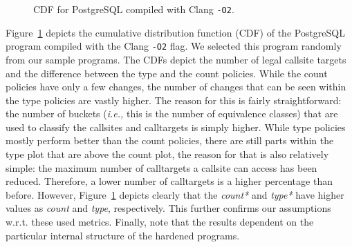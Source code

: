 \begin{figure}[h] 
\vspace{-.9cm}
  \begin{minipage}[b]{1.0\linewidth}
    \centering
    \resizebox{.7\columnwidth}{!}{}
    \vspace{-.4cm}
    \caption{CDF for PostgreSQL compiled with Clang \texttt{-O2}.} 
    \label{fig7} 
    \vspace{1ex}
  \end{minipage}%
\vspace{-.2cm}
\end{figure}
Figure~\ref{fig7}
depicts the cumulative distribution function (CDF) of the PostgreSQL program compiled with the Clang \texttt{-O2} flag. 
We selected this program randomly from our sample programs. 
The CDFs depict the number of legal callsite targets and the difference between the type and the count policies. 
While the count policies have only a few changes, the number of changes that can be seen within the 
type policies are vastly higher. The reason for this is fairly straightforward: the number 
of buckets (\textit{i.e.,} this is the number of equivalence classes)
that are used to classify the callsites and calltargets is simply higher. While type policies mostly 
perform better than the count policies, there are still parts within the type plot that are above the 
count plot, the reason for that is also relatively simple: the maximum number of calltargets a 
callsite can access has been reduced. Therefore, a lower number of calltargets is a higher 
percentage than before. However, Figure~\ref{fig7} depicts clearly
that the \textit{count*} and \textit{type*} have higher values as 
\textit{count} and \textit{type}, respectively. This further confirms our assumptions 
w.r.t. these used metrics. Finally, note that the results dependent on the particular 
internal structure of the hardened programs.

